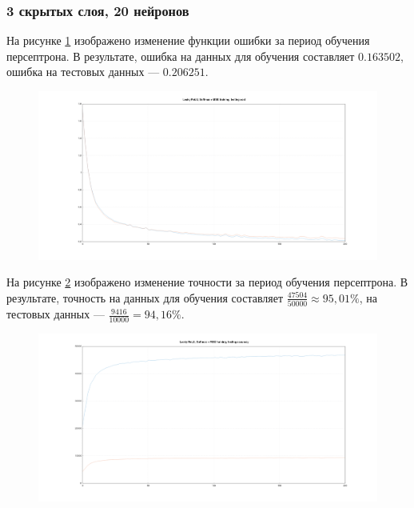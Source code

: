 \documentclass[a4paper, 14pt]{extarticle}
\begin{document}
\subsubsection{3 скрытых слоя, 20 нейронов}


На рисунке \ref{fig:3_20_leaky_relu_softmax_mse_cost} изображено изменение функции ошибки за период обучения персептрона.
В результате, ошибка на данных для обучения составляет $0.163502$, ошибка на тестовых данных --- $0.206251$.

\begin{figure}[!htb]
  \centering\includegraphics[width=\textwidth]{images/3_20_leaky_relu_softmax_mse_cost.png}
  \caption{}
  \label{fig:3_20_leaky_relu_softmax_mse_cost}
\end{figure}

На рисунке \ref{fig:3_20_leaky_relu_softmax_mse_accuracy} изображено изменение точности за период обучения персептрона.
В результате, точность на данных для обучения составляет $\frac{47504}{50000} \approx 95,01\%$, на тестовых данных --- $\frac{9416}{10000} = 94,16\%$.

\begin{figure}[!htb]
  \centering\includegraphics[width=\textwidth]{images/3_20_leaky_relu_softmax_mse_accuracy.png}
  \caption{}
  \label{fig:3_20_leaky_relu_softmax_mse_accuracy}
\end{figure}
\end{document}
